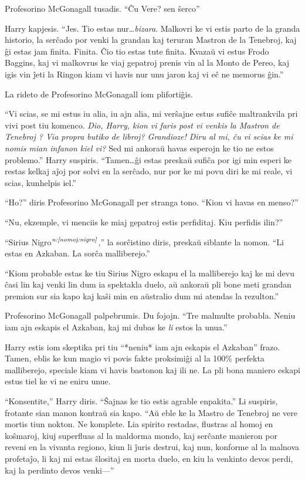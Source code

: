 Profesorino McGonagall tusadis. ``Ĉu Vere? sen ŝerco''

Harry kapjesis. ``Jes. Tio estas nur\ldots \emph{bizara}. Malkovri ke
vi estis parto de la granda historio, la serĉado por venki la grandan
kaj teruran Mastron de la Tenebroj, kaj ĝi estas jam finita. Finita. Ĉio
tio estas tute finita. Kvazaŭ vi estus Frodo Baggins, kaj vi malkovrus
ke viaj gepatroj prenis vin al la Monto de Pereo, kaj igis vin ĵeti la
Ringon kiam vi havis nur unu jaron kaj vi eĉ ne memorus ĝin.''

La rideto de Profesorino McGonagall iom plifortiĝis.

``Vi scias, se mi estus iu alia, iu ajn alia, mi verŝajne estus sufiĉe
maltrankvila pri vivi post tiu komenco. \emph{Dio, Harry, kion vi faris
post vi venkis la Mastron de Tenebroj ? Via propra butiko de libroj?
Grandioze! Diru al mi, ĉu vi scias ke mi nomis mian infanon kiel
vi?} Sed mi ankoraŭ havas esperojn ke tio ne estos problemo.'' Harry
suspiris. ``Tamen\ldots ĝi estas preskaŭ sufiĉa por igi min esperi ke
restas kelkaj aĵoj por solvi en la serĉado, nur por ke mi povu diri ke mi
reale, vi scias, kunhelpis iel.''

``Ho?'' diris Profesorino McGonagall per stranga tono. ``Kion vi havas
en menso?''

``Nu, ekzemple, vi menciis ke miaj gepatroj estis perfiditaj. Kiu
perfidis ilin?''

``Sirius Nigro$^{\textit{n:\ref{nomoj:nigro}}}$,'' la sorĉistino diris, preskaŭ
siblante la nomon. ``Li estas en Azkaban. La sorĉa malliberejo.''

``Kiom probable estas ke tiu Sirius Nigro eskapu el la malliberejo kaj
ke mi devu ĉasi lin kaj venki lin dum ia spektakla duelo, aŭ ankoraŭ
pli bone meti grandan premion sur sia kapo kaj kaŝi min en aŭstralio
dum mi atendas la rezulton.''

Profesorino McGonagall palpebrumis. Du fojojn. ``Tre malmulte probabla. Neniu
iam ajn eskapis el Azkaban, kaj mi dubas ke \emph{li} estos la unua.''

Harry estis iom skeptika pri tiu ``*neniu* iam ajn eskapis el
Azkaban'' frazo. Tamen, eblis ke kun magio vi povis fakte proksimiĝi al la
100\% perfekta malliberejo, speciale kiam vi havis bastonon kaj ili
ne. La pli bona maniero eskapi estus tiel ke vi ne eniru unue.

``Konsentite,'' Harry diris. ``Ŝajnas ke tio estis agrable enpakita.''
Li suspiris, frotante sian manon kontraŭ sia kapo. ``Aŭ eble ke la Mastro
de Tenebroj ne vere mortis tiun nokton. Ne komplete. Lia spirito
restadas, flustras al homoj en koŝmaroj, kiuj superfluas al la maldorma
mondo, kaj serĉante manieron por reveni en la vivanta regiono, kiun li
ĵuris destrui, kaj nun, konforme al la malnova profetaĵo, li kaj mi
estas ŝlositaj en morta duelo, en kiu la venkinto devos perdi, kaj la
perdinto devos venki—''

